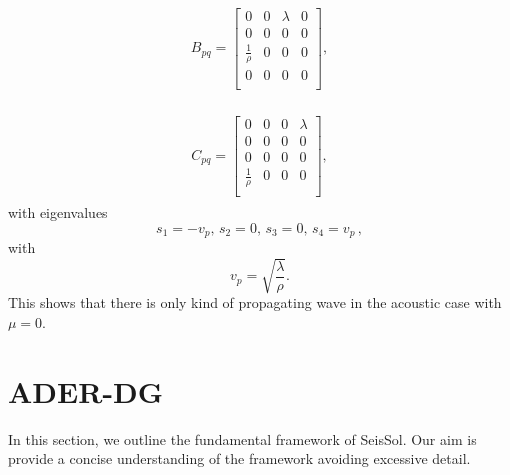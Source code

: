 \begin{align}
    \begin{split}
    B_{pq} = 
        \begin{bmatrix}
            0 & 0 & \lambda & 0 \\
            0 & 0 & 0 & 0 \\
            \frac{1}{\rho} & 0 & 0 & 0\\
            0 & 0 & 0 & 0 \\
    \end{bmatrix},
    \end{split}
\end{align}

\begin{align}
    \begin{split}
    C_{pq} = 
        \begin{bmatrix}
            0 & 0 & 0 & \lambda \\
            0 & 0 & 0 & 0 \\
            0 & 0 & 0 & 0 \\
            \frac{1}{\rho} & 0 & 0 & 0 \\
    \end{bmatrix},
    \end{split}
\end{align}
with eigenvalues
\begin{equation}
    s_1 = -v_p, \, s_2 = 0, \, s_3 = 0, \, s_4 = v_p \, ,
\end{equation}
with
\begin{equation}
    v_p = \sqrt{\frac{\lambda}{\rho}}.
\end{equation}
This shows that there is only kind of propagating wave in the acoustic case with $\mu = 0$.
\section{\texorpdfstring{\ac{ADER}-\ac{DG}}{ADER-DG}}\label{section:ADER-DG}
In this section, we outline the fundamental framework of SeisSol. Our aim is provide a concise understanding of the framework avoiding excessive detail.
